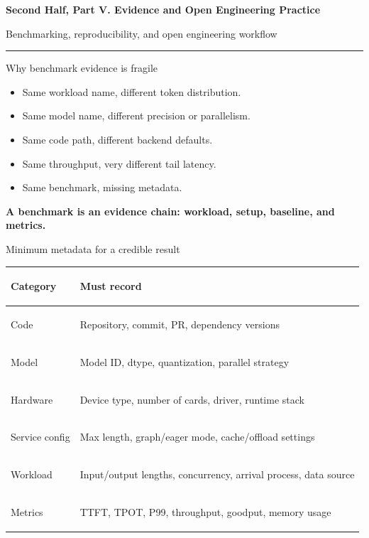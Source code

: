 \documentclass[aspectratio=169,11pt]{beamer}
\newcommand{\term}[1]{\textcolor{HUSTBlue}{\textbf{#1}}}
\newcommand{\topicsectionpage}[2]{%
  \begin{frame}[plain]
    \vspace{1.0cm}
    {\huge\bfseries\textcolor{HUSTBlue}{#1}}\par
    \vspace{0.26cm}
    {\large\textcolor{HUSTGray}{#2}}\par
    \vfill
    \textcolor{HUSTLine}{\rule{0.76\paperwidth}{0.8pt}}
  \end{frame}
}
\begin{document}
\fi

\topicsectionpage{Second Half, Part V. Evidence and Open Engineering Practice}{Benchmarking, reproducibility, and open engineering workflow}

\begin{frame}{Why benchmark evidence is fragile}
  \begin{itemize}
    \item Same workload name, different token distribution.
    \item Same model name, different precision or parallelism.
    \item Same code path, different backend defaults.
    \item Same throughput, very different tail latency.
    \item Same benchmark, missing metadata.
  \end{itemize}
  \vspace{0.35cm}
  \begin{center}
    \large\term{A benchmark is an evidence chain: workload, setup, baseline, and metrics.}
  \end{center}
\end{frame}

\begin{frame}{Minimum metadata for a credible result}
  \begin{tabularx}{\textwidth}{>{\bfseries\raggedright\arraybackslash}p{2.2cm}Y}
    \toprule
    Category & Must record \\
    \midrule
    Code & Repository, commit, PR, dependency versions \\
    Model & Model ID, dtype, quantization, parallel strategy \\
    Hardware & Device type, number of cards, driver, runtime stack \\
    Service config & Max length, graph/eager mode, cache/offload settings \\
    Workload & Input/output lengths, concurrency, arrival process, data source \\
    Metrics & TTFT, TPOT, P99, throughput, goodput, memory usage \\
    \bottomrule
  \end{tabularx}
\end{frame}
\end{document}

